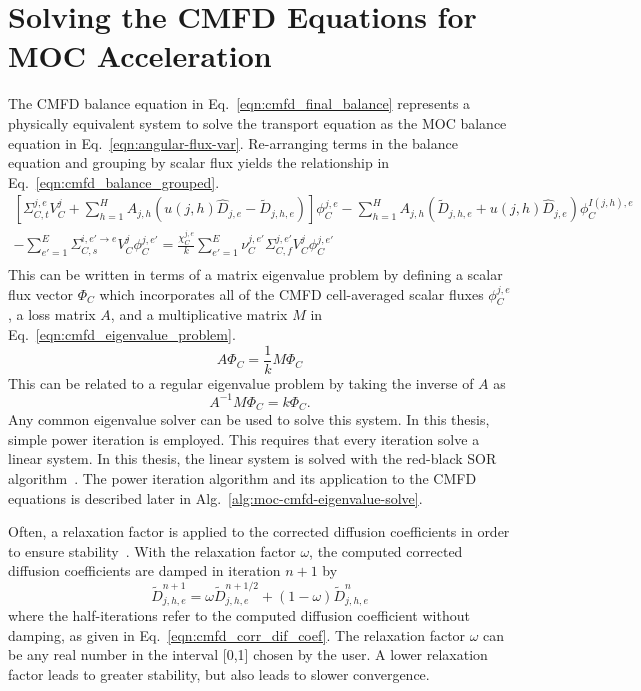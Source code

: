 \section{Solving the CMFD Equations for MOC Acceleration}
The \ac{CMFD} balance equation in Eq.~\ref{eqn:cmfd_final_balance} represents a physically equivalent system to solve the transport equation as the \ac{MOC} balance equation in Eq.~\ref{eqn:angular-flux-var}. Re-arranging terms in the balance equation and grouping by scalar flux yields the relationship in Eq.~\ref{eqn:cmfd_balance_grouped}.
\begin{equation}
\begin{split}
\left[\Sigma_{C,t}^{j,e} V_C^j + \sum_{h=1}^H A_{j,h} \left(u(j,h) \hat{D}_{j,e} - \tilde{D}_{j,h,e} \right) \right] \phi_C^{j,e} - \sum_{h=1}^H A_{j,h} \left( \tilde{D}_{j,h,e} + u(j,h) \hat{D}_{j,e} \right) \phi_C^{I(j,h),e} & \\ - \sum_{e'=1}^E  \Sigma_{C,s}^{i, e' \rightarrow e} V_C^j \phi_C^{j,e'} =
\frac{\chi_C^{j,e}}{k} \sum_{e'=1}^{E} \nu_C^{j, e'} \Sigma_{C,f}^{j,e'} V_C^j \phi_C^{j,e'} & \\
\end{split}
\label{eqn:cmfd_balance_grouped}
\end{equation}
This can be written in terms of a matrix eigenvalue problem by defining a scalar flux vector $\Phi_C$ which incorporates all of the \ac{CMFD} cell-averaged scalar fluxes $\phi_C^{j,e}$, a loss matrix $A$, and a multiplicative matrix $M$ in Eq.~\ref{eqn:cmfd_eigenvalue_problem}.
\begin{equation}
A \Phi_C = \frac{1}{k} M \Phi_C
\label{eqn:cmfd_eigenvalue_problem}
\end{equation}
This can be related to a regular eigenvalue problem by taking the inverse of $A$ as
\begin{equation}
A^{-1} M \Phi_C = k \Phi_C.
\end{equation}
Any common eigenvalue solver can be used to solve this system. In this thesis, simple power iteration is employed. This requires that every iteration solve a linear system. In this thesis, the linear system is solved with the red-black SOR algorithm~\cite{kords-book}. The power iteration algorithm and its application to the \ac{CMFD} equations is described later in Alg.~\ref{alg:moc-cmfd-eigenvalue-solve}.

Often, a relaxation factor is applied to the corrected diffusion coefficients in order to ensure stability~\cite{smith2002casmo}. With the relaxation factor $\omega$, the computed corrected diffusion coefficients are damped in iteration $n+1$ by
\begin{equation}
\tilde{D}_{j,h,e}^{n+1} = \omega \tilde{D}_{j,h,e}^{n+1/2} + (1-\omega) \tilde{D}_{j,h,e}^{n}
\label{eq:cmfd_damp_corr_dif_coef}
\end{equation}
where the half-iterations refer to the computed diffusion coefficient without damping, as given in Eq.~\ref{eqn:cmfd_corr_dif_coef}. The relaxation factor $\omega$ can be any real number in the interval [0,1] chosen by the user. A lower relaxation factor leads to greater stability, but also leads to slower convergence.

